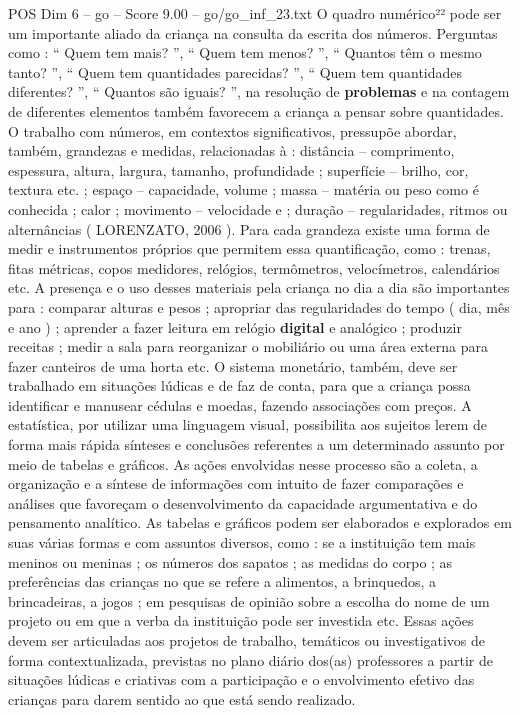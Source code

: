 \begin{textsample}{POS Dim 6 – go – Score 9.00 – go/go\_inf\_23.txt}
O quadro numérico²² pode ser um importante aliado da criança na consulta da escrita dos números.
Perguntas como : “ Quem tem mais? ”, “ Quem tem menos? ”, “ Quantos têm o mesmo tanto? ”, “ Quem tem quantidades parecidas? ”, “ Quem tem quantidades diferentes? ”, “ Quantos são iguais? ”, na resolução de \textbf{problemas} e na contagem de diferentes elementos também favorecem a criança a pensar sobre quantidades.
O trabalho com números, em contextos significativos, pressupõe abordar, também, grandezas e medidas, relacionadas à : distância – comprimento, espessura, altura, largura, tamanho, profundidade ; superfície – brilho, cor, textura etc. ; espaço – capacidade, volume ; massa – matéria ou peso como é conhecida ; calor ; movimento – velocidade e ; duração – regularidades, ritmos ou alternâncias ( LORENZATO, 2006 ).
Para cada grandeza existe uma forma de medir e instrumentos próprios que permitem essa quantificação, como : trenas, fitas métricas, copos medidores, relógios, termômetros, velocímetros, calendários etc.
A presença e o uso desses materiais pela criança no dia a dia são importantes para : comparar alturas e pesos ; apropriar das regularidades do tempo ( dia, mês e ano ) ; aprender a fazer leitura em relógio \textbf{digital} e analógico ; produzir receitas ; medir a sala para reorganizar o mobiliário ou uma área externa para fazer canteiros de uma horta etc.
O sistema monetário, também, deve ser trabalhado em situações lúdicas e de faz de conta, para que a criança possa identificar e manusear cédulas e moedas, fazendo associações com preços.
A estatística, por utilizar uma linguagem visual, possibilita aos sujeitos lerem de forma mais rápida sínteses e conclusões referentes a um determinado assunto por meio de tabelas e gráficos.
As ações envolvidas nesse processo são a coleta, a organização e a síntese de informações com intuito de fazer comparações e análises que favoreçam o desenvolvimento da capacidade argumentativa e do pensamento analítico.
As tabelas e gráficos podem ser elaborados e explorados em suas várias formas e com assuntos diversos, como : se a instituição tem mais meninos ou meninas ; os números dos sapatos ; as medidas do corpo ; as preferências das crianças no que se refere a alimentos, a brinquedos, a brincadeiras, a jogos ; em pesquisas de opinião sobre a escolha do nome de um projeto ou em que a verba da instituição pode ser investida etc.
Essas ações devem ser articuladas aos projetos de trabalho, temáticos ou investigativos de forma contextualizada, previstas no plano diário dos(as) professores a partir de situações lúdicas e criativas com a participação e o envolvimento efetivo das crianças para darem sentido ao que está sendo realizado.

\end{textsample}
